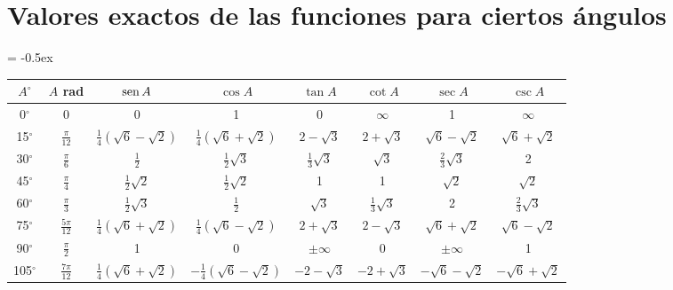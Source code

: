\clearpage
\section*{Valores exactos de las funciones para ciertos ángulos}

\begin{table}[htb]
\extrarowheight = -0.5ex
\renewcommand{\arraystretch}{1.71}
\centering
\begin{tabular}{|c|c|c|c|c|c|c|c|}
\hline
$A^{\circ}$ & $A$ rad  & $\operatorname{sen} A$ & $\cos A$  & $\tan A$ & $\cot A$  & $\sec A$ & $\csc A$  \\ \hline

0$^{\circ}$ & 0 & 0 & 1 & 0 & $\infty$ & 1 & $\infty$ \\ \hline

15$^{\circ}$ & $\frac{\pi}{12}$ & $\frac{1}{4}\left(\sqrt{6}-\sqrt{2}\right)$ & $\frac{1}{4}\left(\sqrt{6}+\sqrt{2}\right)$ & $2-\sqrt{3}$ & $2+\sqrt{3}$ & $\sqrt{6}-\sqrt{2}$ & $\sqrt{6}+\sqrt{2}$ \\ \hline

30$^{\circ}$ & $\frac{\pi}{6}$ & $\frac{1}{2}$ & $\frac{1}{2}\sqrt{3}$ & $\frac{1}{3}\sqrt{3}$ & $\sqrt{3}$ & $\frac{2}{3}\sqrt{3}$ & 2 \\ \hline

45$^{\circ}$ & $\frac{\pi}{4}$ & $\frac{1}{2}\sqrt{2}$ & $\frac{1}{2}\sqrt{2}$ & 1 & 1 & $\sqrt{2}$ & $\sqrt{2}$ \\ \hline

60$^{\circ}$ & $\frac{\pi}{3}$ & $\frac{1}{2}\sqrt{3}$ & $\frac{1}{2}$ & $\sqrt{3}$ & $\frac{1}{3}\sqrt{3}$ & 2 & $\frac{2}{3}\sqrt{3}$ \\ \hline

75$^{\circ}$ & $\frac{5\pi}{12}$ & $\frac{1}{4}\left(\sqrt{6}+\sqrt{2}\right)$ & $\frac{1}{4}\left(\sqrt{6}-\sqrt{2}\right)$ & $2+\sqrt{3}$ & $2-\sqrt{3}$ & $\sqrt{6}+\sqrt{2}$ & $\sqrt{6}-\sqrt{2}$ \\ \hline

90$^{\circ}$ & $\frac{\pi}{2}$ & 1 & 0 & $\pm \infty$ & 0 & $\pm \infty$ & 1 \\ \hline

105$^{\circ}$ & $\frac{7\pi}{12}$ & $\frac{1}{4}\left(\sqrt{6}+\sqrt{2}\right)$ & $-\frac{1}{4}\left(\sqrt{6}-\sqrt{2}\right)$ & $-2-\sqrt{3}$ & $-2+\sqrt{3}$ & $-\sqrt{6}-\sqrt{2}$ & $-\sqrt{6}+\sqrt{2}$ \\ \hline


\end{tabular}
\end{table}
